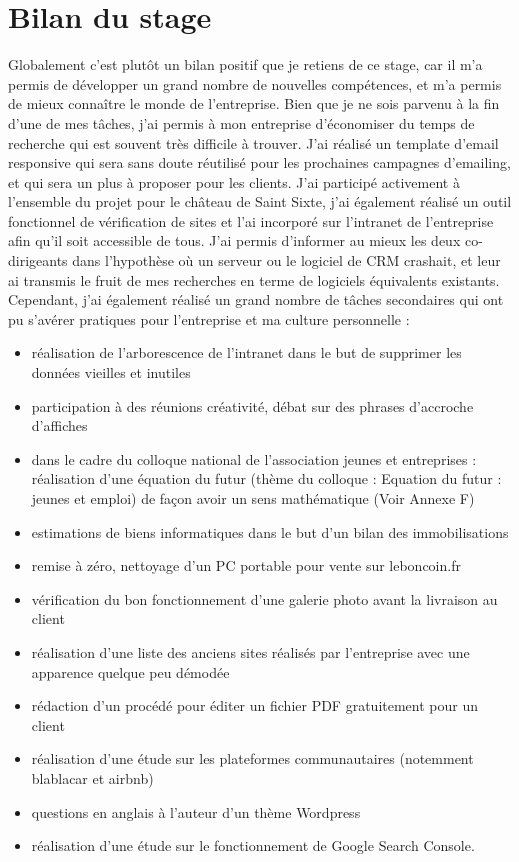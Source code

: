\documentclass[report]{tnreport}
\begin{document}
\chapter{Bilan du stage}
Globalement c’est plutôt un bilan positif que je retiens de ce stage, car il m’a permis de développer un grand nombre de nouvelles compétences, et m’a permis de mieux connaître le monde de l’entreprise. Bien que je ne sois parvenu à la fin d’une de mes tâches, j’ai permis à mon entreprise d’économiser du temps de recherche qui est souvent très difficile à trouver. J’ai réalisé un template d’email responsive qui sera sans doute réutilisé pour les prochaines campagnes d’emailing, et qui sera un plus à proposer pour les clients. J’ai participé activement à l’ensemble du projet pour le château de Saint Sixte, j’ai également réalisé un outil fonctionnel de vérification de sites et l’ai incorporé sur l’intranet de l’entreprise afin qu’il soit accessible de tous. J’ai permis d’informer au mieux les deux co-dirigeants dans l’hypothèse où un serveur ou le logiciel de CRM crashait, et leur ai transmis le fruit de mes recherches en terme de logiciels équivalents existants.
Cependant, j’ai également réalisé un grand nombre de tâches secondaires qui ont pu s’avérer pratiques pour l’entreprise et ma culture personnelle : 
\begin{itemize}
\item réalisation de l’arborescence de l’intranet dans le but de supprimer les données vieilles et inutiles
\item participation à des réunions créativité, débat sur des phrases d’accroche d’affiches 
\item dans le cadre du colloque national de l’association jeunes et entreprises : réalisation d’une équation du futur (thème du colloque : Equation du futur : jeunes et emploi) de façon avoir un sens mathématique (Voir Annexe F)
\item estimations de biens informatiques dans le but d’un bilan des immobilisations
\item remise à zéro, nettoyage d’un PC portable pour vente sur leboncoin.fr
\item vérification du bon fonctionnement d’une galerie photo avant la livraison au client
\item réalisation d’une liste des anciens sites réalisés par l’entreprise avec une apparence quelque peu démodée
\item rédaction d’un procédé pour éditer un fichier PDF gratuitement pour un client
\item réalisation d’une étude sur les plateformes communautaires (notemment blablacar et airbnb)
\item questions en anglais à l’auteur d’un thème Wordpress
\item réalisation d’une étude sur le fonctionnement de Google Search Console.
\end{itemize}
\end{document}
